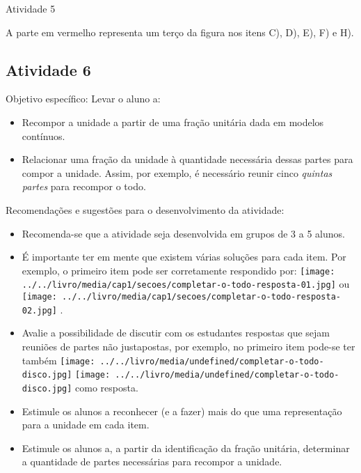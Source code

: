 \documentclass[oneside]{book}
\begin{document}
\begin{multicols}{2}
\begin{resposta*}{Atividade 5}

A parte em vermelho representa um terço da figura nos itens C), D), E), F) e H).
\end{resposta*}



\subsection{Atividade 6}
  Objetivo específico: Levar o aluno a:
\begin{itemize} %
    \item       Recompor a unidade a partir de uma fração unitária dada em modelos contínuos.
    \item       Relacionar uma fração da unidade à quantidade necessária dessas partes para compor a unidade. Assim, por exemplo, é necessário reunir cinco       {\it quintas partes}       para recompor o todo.
\end{itemize} %



  Recomendações e sugestões para o desenvolvimento da atividade:
\begin{itemize} %
    \item       Recomenda-se que a atividade seja desenvolvida em grupos de 3 a 5 alunos.
    \item       É importante ter em mente que existem várias soluções para cada item. Por exemplo, o primeiro item pode ser corretamente respondido por:             \texttt{[image: ../../livro/media/cap1/secoes/completar-o-todo-resposta-01.jpg]}       ou             \texttt{[image: ../../livro/media/cap1/secoes/completar-o-todo-resposta-02.jpg]}      .
    \item       Avalie a possibilidade de discutir com os estudantes respostas que sejam reuniões de partes não justapostas, por exemplo, no primeiro item pode-se ter também             \texttt{[image: ../../livro/media/undefined/completar-o-todo-disco.jpg]}                   \texttt{[image: ../../livro/media/undefined/completar-o-todo-disco.jpg]}       como resposta.
    \item       Estimule os alunos a reconhecer (e a fazer) mais do que uma representação para a unidade em cada item.
    \item       Estimule os alunos a, a partir da identificação da fração unitária, determinar a quantidade de partes necessárias para recompor a unidade.
\end{itemize} %


\end{multicols}
\end{document}
